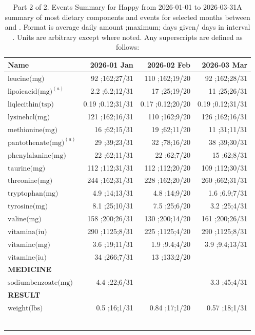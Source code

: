 \begin{table}[H]
\centering
\begin{tabular}{|l|r|r|r|}
\hline
Name&2026-01 Jan&2026-02 Feb&2026-03 Mar\\
\hline
$\textrm{leucine(mg)}$&92 ;162;27/31&110 ;162;19/20&92 ;162;28/31\\
$\textrm{lipoicacid(mg)}^{\left(a\right)}$&2.2 ;6.2;12/31&17 ;25;19/20&11 ;25;26/31\\
$\textrm{liqlecithin(tsp)}$&0.19 ;0.12;31/31&0.17 ;0.12;20/20&0.19 ;0.12;31/31\\
$\textrm{lysinehcl(mg)}$&121 ;162;16/31&110 ;162;9/20&126 ;162;16/31\\
$\textrm{methionine(mg)}$&16 ;62;15/31&19 ;62;11/20&11 ;31;11/31\\
$\textrm{pantothenate(mg)}^{\left(a\right)}$&29 ;39;23/31&32 ;78;16/20&38 ;39;30/31\\
$\textrm{phenylalanine(mg)}$&22 ;62;11/31&22 ;62;7/20&15 ;62;8/31\\
$\textrm{taurine(mg)}$&112 ;112;31/31&112 ;112;20/20&109 ;112;30/31\\
$\textrm{threonine(mg)}$&244 ;162;31/31&228 ;162;20/20&260 ;662;31/31\\
$\textrm{tryptophan(mg)}$&4.9 ;14;13/31&4.8 ;14;9/20&1.6 ;6.9;7/31\\
$\textrm{tyrosine(mg)}$&8.1 ;25;10/31&7.5 ;25;6/20&3.2 ;25;4/31\\
$\textrm{valine(mg)}$&158 ;200;26/31&130 ;200;14/20&161 ;200;26/31\\
$\textrm{vitamina(iu)}$&290 ;1125;8/31&225 ;1125;4/20&290 ;1125;8/31\\
$\textrm{vitaminc(mg)}$&3.6 ;19;11/31&1.9 ;9.4;4/20&3.9 ;9.4;13/31\\
$\textrm{vitamine(iu)}$&34 ;266;7/31&13 ;133;2/20&\\
{\bf MEDICINE}&&&\\
$\textrm{sodiumbenzoate(mg)}$&4.4 ;22;6/31&&3.3 ;45;4/31\\
{\bf RESULT}&&&\\
$\textrm{weight(lbs)}$&0.5 ;16;1/31&0.84 ;17;1/20&0.57 ;18;1/31\\
&&&\\
&&&\\
&&&\\
&&&\\
&&&\\
&&&\\
\hline
\end{tabular}
\caption{Part 2 of 2.  Events Summary for Happy   from 2026-01-01 to 2026-03-31A summary of most dietary components and events  for selected months between \mjmdateminn and \mjmdatemaxn. Format is average daily amount ;maximum; days given/ days in interval . Units are arbitrary except where noted. Any  superscripts are defined as follows:  \mjmsuperscriptsn}
\end{table}
